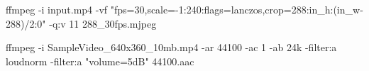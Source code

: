 ffmpeg -i input.mp4 -vf "fps=30,scale=-1:240:flags=lanczos,crop=288:in_h:(in_w-288)/2:0" -q:v 11 288_30fps.mjpeg

ffmpeg -i SampleVideo_640x360_10mb.mp4 -ar 44100 -ac 1 -ab 24k -filter:a loudnorm -filter:a "volume=5dB" 44100.aac